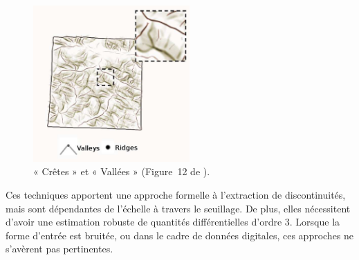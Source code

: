 \begin{figure}[ht]{
    \begin{center}
    \includegraphics[height=6cm]{images/Feature/RidgesValleys}
    \end{center}}
    \caption[Notations.]{« Crêtes » et « Vallées » (Figure~12 de \cite{Vergne2011}).
      \label{fig:ridges-valleys}}
\end{figure}

Ces techniques apportent une approche formelle à l'extraction de discontinuités,
mais sont dépendantes de l'échelle à travers le seuillage. De plus, elles
nécessitent d'avoir une estimation robuste de quantités différentielles d'ordre
$3$. Lorsque la forme d'entrée est bruitée, ou dans le cadre de données
digitales, ces approches ne s'avèrent pas pertinentes.
%
%
%
%
